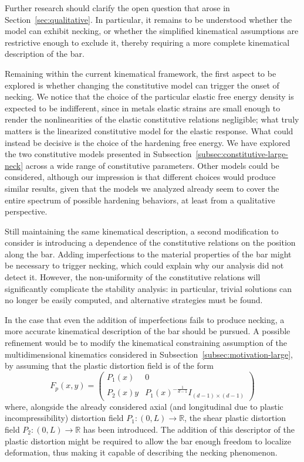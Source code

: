\documentclass[a4paper,10pt,twoside]{amsbook}
\numberwithin{section}{chapter}
\numberwithin{equation}{chapter}
\theoremstyle{definition}
\begin{document}
Further research should clarify the open question that arose in Section~\ref{sec:qualitative}. In particular, it remains to be understood whether the model can exhibit necking, or whether the simplified kinematical assumptions are restrictive enough to exclude it, thereby requiring a more complete kinematical description of the bar.

Remaining within the current kinematical framework, the first aspect to be explored is whether changing the constitutive model can trigger the onset of necking. We notice that the choice of the particular elastic free energy density is expected to be indifferent, since in metals elastic strains are small enough to render the nonlinearities of the elastic constitutive relations negligible; what truly matters is the linearized constitutive model for the elastic response. What could instead be decisive is the choice of the hardening free energy.  We have explored the two constitutive models presented in Subsection~\ref{subsec:constitutive-large-neck} across a wide range of constitutive parameters. Other models could be considered, although our impression is that different choices would produce similar results, given that the models we analyzed already seem to cover the entire spectrum of possible hardening behaviors, at least from a qualitative perspective.

Still maintaining the same kinematical description, a second modification to consider is introducing a dependence of the constitutive relations on the position along the bar. Adding imperfections to the material properties of the bar might be necessary to trigger necking, which could explain why our analysis did not detect it. However, the non-uniformity of the constitutive relations will significantly complicate the stability analysis: in particular, trivial solutions can no longer be easily computed, and alternative strategies must be found.

In the case that even the addition of imperfections fails to produce necking, 
a more accurate kinematical description of the bar should be pursued. A possible 
refinement would be to modify the kinematical constraining assumption of the 
multidimensional kinematics considered in Subsection~\ref{subsec:motivation-large}, 
by assuming that the plastic distortion field is of the form
\[
F_p(x,y)=\begin{pmatrix}
P_1(x) & 0 \\
P_2(x)y & P_1(x)^{-\frac{1}{d-1}}I_{(d-1)\times(d-1)}
\end{pmatrix}
\]
where, alongside the already considered axial (and longitudinal due to plastic 
incompressibility) distortion field $P_1\colon(0,L)\to\mathbb{R}$, the shear 
plastic distortion field $P_2 \colon(0,L)\to\mathbb{R}$ has been introduced. 
The addition of this descriptor of the plastic distortion might be required to 
allow the bar enough freedom to localize deformation, thus making it 
capable of describing the necking phenomenon.
\end{document}
